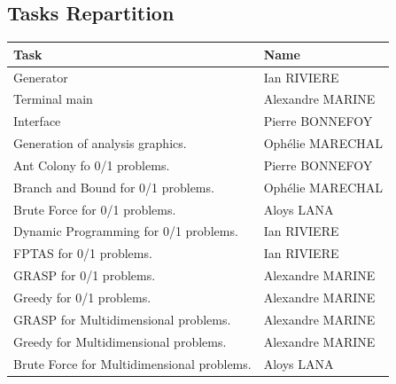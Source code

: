 \documentclass[a4paper, 11pt]{article}
\begin{document}
    \subsection{Tasks Repartition}
    \begin{center}
        \begin{tabular}{|p{4cm}|p{2cm}|}
            \hline
            \textbf{Task} & \textbf{Name} \\
            \hline
            Generator & Ian RIVIERE\\
            \hline
            Terminal main & Alexandre MARINE\\
            \hline
            Interface & Pierre BONNEFOY \\
            \hline
            Generation of analysis graphics. & Ophélie MARECHAL \\
            \hline
            Ant Colony fo 0/1 problems. & Pierre BONNEFOY \\
            \hline
            Branch and Bound for 0/1 problems. & Ophélie MARECHAL \\
            \hline
            Brute Force for 0/1 problems.  & Aloys LANA \\
            \hline
            Dynamic Programming for 0/1 problems. & Ian RIVIERE \\
            \hline 
            FPTAS for 0/1 problems. & Ian RIVIERE \\
            \hline
            GRASP for 0/1 problems.  & Alexandre MARINE \\
            \hline
            Greedy for 0/1 problems.  & Alexandre MARINE \\
            \hline
            GRASP for Multidimensional problems.  & Alexandre MARINE \\
            \hline
            Greedy for Multidimensional problems.  & Alexandre MARINE \\
            \hline
            Brute Force for Multidimensional problems.  & Aloys LANA \\
            \hline
        \end{tabular}
    \end{center}

    \newpage
\end{document}
